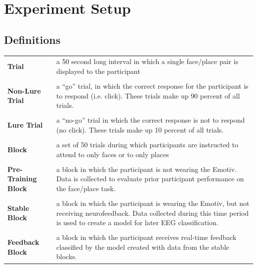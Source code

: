 \documentclass[11pt]{report}
\begin{document}
\section{Experiment Setup}

\subsection{Definitions}
\begin{table}[h]
\begin{tabular}{p{4cm}|p{10cm}}
\textbf{Trial}  & a 50 second long interval in which a single face/place pair is displayed to the participant  \\
\\
\textbf{Non-Lure Trial} & a “go” trial, in which the correct response for the participant is to respond (i.e. click).  These trials make up 90 percent of all trials.\\
\\
\textbf{Lure Trial}  & a “no-go” trial in which the correct response is not to respond (no click).  These trials make up 10 percent of all trials.\\
\\
\textbf{Block} & a set of 50 trials during which participants are instructed to attend to only faces or to only places\\
\\
\textbf{Pre-Training Block}  & a block in which the participant is not wearing the Emotiv.  Data is collected to evaluate prior participant performance on the face/place task. \\
\\
\textbf{Stable Block} & a block in which the participant is wearing the Emotiv, but not receiving neurofeedback.  Data collected during this time period is used to create a model for later EEG classification.\\
\\
\textbf{Feedback Block} & a block in which the participant receives real-time feedback classified by the model created with data from the stable blocks.
\end{tabular}
\end{table}
\end{document}
